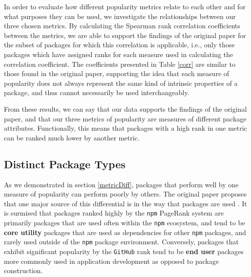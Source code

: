 \documentclass[10pt,conference]{IEEEtran}
\def\code#1{\texttt{#1}}
\begin{document}
In order to evaluate how different popularity metrics
relate to each other and for what purposes they can be used,
we investigate the relationships between our three chosen metrics.
By calculating the Spearman rank correlation coefficients between
the metrics, we are able to support the findings of the original 
paper for the subset of packages for which this correlation is applicable,
i.e., only those packages which have assigned ranks for each measure used
in calculating the correlation coefficient. The coefficients presented 
in Table \ref{corr} are similar to those found in the original paper, 
supporting the idea that each measure of popularity does not always
represent the same kind of intrinsic properties of a package, and
thus cannot necessarily be used interchangeably.


From these results, we can say that our data supports the findings of the original paper, and
that our three metrics of popularity
are measures of different package attributes. Functionally, this means that packages
with a high rank in one metric can be ranked much lower by another metric.

\subsection{Distinct Package Types}


As we demonstrated in section \ref{metricDiff}, packages that perform well
by one measure of popularity can perform poorly by others. The original paper
proposes that one major source of this differential is in the way that packages
are used \cite{Wittern:2016}. It is surmised that packages ranked highly by the
\code{npm} PageRank system are primarily packages that are used often within the
\code{npm} ecosystem, and tend to be \textbf{core utility} packages that are used
as dependencies for other \code{npm} packages, and rarely used outside of the
\code{npm} package environment. Conversely, packages that exhibit
significant popularity by the \code{GitHub} rank tend to be \textbf{end user} packages more
commonly used in application development as opposed to package construction. 
\end{document}
